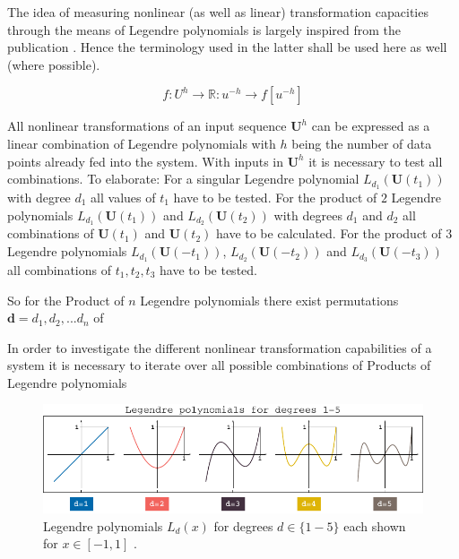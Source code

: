 The idea of measuring nonlinear (as well as linear) transformation capacities through the means of Legendre polynomials is largely inspired from the publication \cite{DAM12}. Hence the terminology used in the latter shall be used here as well (where possible). 

	\begin{equation}
	f:U^{h}\rightarrow \mathbb{R}:u^{-h}\rightarrow f\left[ u^{-h}\right]
	\label{eq:legendre_f_U_equaiont}
	\end{equation}

All nonlinear transformations of an input sequence $\textbf{U}^{h}$ can be expressed as a linear combination of Legendre  polynomials with $h$ being the number of data points already fed into the system. With inputs in $\textbf{U}^{h}$ it is necessary to test all combinations. To elaborate: 
For a singular Legendre polynomial $L_{d_{1}}(\textbf{U}(t_1))$ with degree $d_1$ all values of $t_1$ have to be tested.
For the product of $2$ Legendre polynomials $L_{d_{1}}(\textbf{U}(t_1))$ and $L_{d_{2}}(\textbf{U}(t_2))$ with degrees $d_1$ and $d_2$ all combinations of $\textbf{U}(t_1)$ and $\textbf{U}(t_2)$ have to be calculated.
For the product of $3$ Legendre polynomials $L_{d_{1}}(\textbf{U}(-t_1))$, $L_{d_{2}}(\textbf{U}(-t_2))$ and $L_{d_{3}}(\textbf{U}(-t_3))$ all combinations of ${t_1,t_2,t_3}$ have to be tested.

So for the Product of $n$ Legendre polynomials there exist permutations ${\textbf{d}}={d_1,d_2,...d_n}$ of 






In order to investigate the different nonlinear transformation capabilities of a system it is necessary to iterate over all possible combinations of Products of Legendre polynomials  

\begin{figure}
	\includegraphics[width=0.99\linewidth]{pics/legendre_degrees}
	\caption{Legendre polynomials $L_{d}(x)$ for degrees $d \in \{1-5\}$ each shown for $x \in [-1,1]$ .}
	\label{fig:legendreDegrees}
\end{figure}

